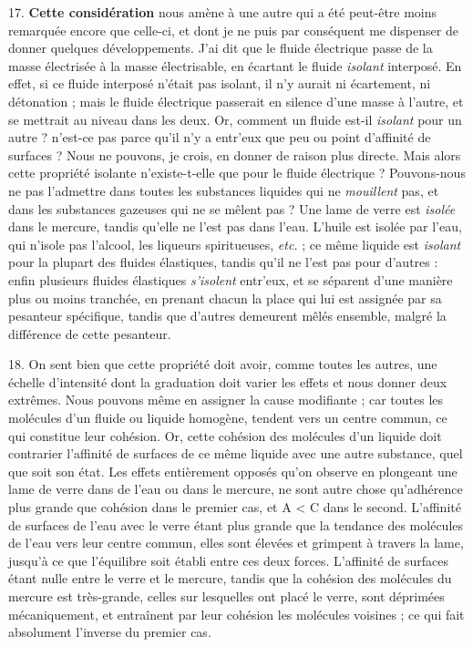 \documentclass[a4paper, 11pt, oneside, polutonikogreek, french]{article}
\begin{document}
17. \textbf{Cette considération} nous amène à une autre qui a été peut-être moins remarquée encore que celle-ci, et dont je ne puis par conséquent me dispenser de donner quelques développements. J'ai dit que le fluide électrique passe de la masse électrisée à la masse électrisable, en écartant le fluide \emph{isolant} interposé. En effet, si ce fluide interposé n'était pas isolant, il n'y aurait ni écartement, ni détonation ; mais le fluide électrique passerait en silence d'une masse à l'autre, et se mettrait au niveau dans les deux. Or, comment un fluide est-il \emph{isolant} pour un autre ? n'est-ce pas parce qu'il n'y a entr'eux que peu ou point d'affinité de surfaces ? Nous ne pouvons, je crois, en donner de raison plus directe. Mais alors cette propriété isolante n'existe-t-elle que pour le fluide électrique ? Pouvons-nous ne pas l'admettre dans toutes les substances liquides qui ne \emph{mouillent} pas, et dans les substances gazeuses qui ne se mêlent pas ? Une lame de verre est \emph{isolée} dans le mercure, tandis qu'elle ne l'est pas dans l'eau. L'huile est isolée par l'eau, qui n'isole pas l'alcool, les liqueurs spiritueuses, \emph{etc.} ; ce même liquide est \emph{isolant} pour la plupart des fluides élastiques, tandis qu'il ne l'est pas pour d'autres : enfin plusieurs fluides élastiques \emph{s'isolent} entr'eux, et se séparent d'une manière plus ou moins tranchée, en prenant chacun la place qui lui est assignée par sa pesanteur spécifique, tandis que d'autres demeurent mêlés ensemble, malgré la différence de cette pesanteur.

18. On sent bien que cette propriété doit avoir, comme toutes les autres, une échelle d'intensité dont la graduation doit varier les effets et nous donner deux extrêmes. Nous pouvons même en assigner la cause modifiante ; car toutes les molécules d'un fluide ou liquide homogène, tendent vers un centre commun, ce qui constitue leur cohésion. Or, cette cohésion des molécules d'un liquide doit contrarier l'affinité de surfaces de ce même liquide avec une autre substance, quel que soit son état. Les effets entièrement opposés qu'on observe en plongeant une lame de verre dans de l'eau ou dans le mercure, ne sont autre chose qu'adhérence plus grande que cohésion dans le premier cas, et A < C dans le second. L'affinité de surfaces de l'eau avec le verre étant plus grande que la tendance des molécules de l'eau vers leur centre commun, elles sont élevées et grimpent à travers la lame, jusqu'à ce que l'équilibre soit établi entre ces deux forces. L'affinité de surfaces étant nulle entre le verre et le mercure, tandis que la cohésion des molécules du mercure est très-grande, celles sur lesquelles ont placé le verre, sont déprimées mécaniquement, et entraînent par leur cohésion les molécules voisines ; ce qui fait absolument l'inverse du premier cas.
\end{document}
